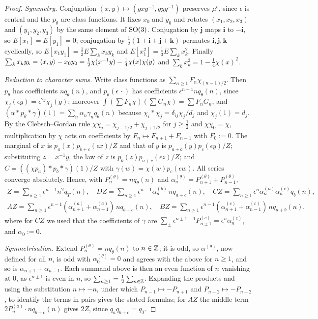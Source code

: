 \begin{proof}
\emph{Symmetry.} Conjugation $(x,y)\mapsto(gxg^{-1},gyg^{-1})$ preserves
$\mu^\epsilon$, since $\epsilon$ is central and the $p_\theta$ are class
functions. It fixes $x_0$ and $y_0$ and rotates $(x_1,x_2,x_3)$ and
$(y_1,y_2,y_3)$ by the same element of $\mathrm{SO}(3)$. Conjugation by $\mathbf j$
maps $\mathbf i$ to $-\mathbf i$, so $E[x_1]=E[y_1]=0$; conjugation by
$\frac12(1+\mathbf i+\mathbf j+\mathbf k)$ permutes $\mathbf i,\mathbf j,
\mathbf k$ cyclically, so $E[x_1y_1]=\frac13E\sum_kx_ky_k$ and $E[x_1^2]=\frac13
E\sum_kx_k^2$. Finally $\sum_kx_ky_k=\langle x,y\rangle-x_0y_0=\frac12\chi(x^{-1}y)-\frac14
\chi(x)\chi(y)$ and $\sum_kx_k^2=1-\frac14\chi(x)^2$.

\emph{Reduction to character sums.} Write class functions as $\sum_{n\ge1}F_n
\chi_{(n-1)/2}$. Then $p_\theta$ has coefficients $nq_\theta(n)$, and
$p_\theta(\epsilon\,\cdot)$ has coefficients $\epsilon^{n-1}nq_\theta(n)$, since
$\chi_j(\epsilon g)=\epsilon^{2j}\chi_j(g)$; moreover $\int(\sum F_n\chi)(\sum
G_n\chi)=\sum F_nG_n$, and $(\alpha*p_\theta*\gamma)(1)=\sum_n\alpha_n\gamma_n
q_\theta(n)$ because $\chi_i*\chi_j=\delta_{ij}\chi_j/d_j$ and $\chi_j(1)=d_j$.
By the Clebsch--Gordan rule $\chi\chi_j=\chi_{j-1/2}+\chi_{j+1/2}$ for $j\ge
\frac12$ and $\chi\chi_0=\chi$, multiplication by $\chi$ acts on coefficients
by $F_n\mapsto F_{n+1}+F_{n-1}$ with $F_0:=0$. The marginal of $x$ is $p_a(x)
p_{b+c}(\epsilon x)/Z$ and that of $y$ is $p_{a+b}(y)p_c(\epsilon y)/Z$;
substituting $z=x^{-1}y$, the law of $z$ is $p_b(z)p_{a+c}(\epsilon z)/Z$; and
$C=((\chi p_a)*p_b*\gamma)(1)/Z$ with $\gamma(w)=\chi(w)p_c(\epsilon w)$. All
series converge absolutely. Hence, with $P^{(\theta)}_n=nq_\theta(n)$ and
$\alpha^{(\theta)}_n=P^{(\theta)}_{n+1}+P^{(\theta)}_{n-1}$,
\begin{gather*}
Z=\sum_{n\ge1}\epsilon^{n-1}n^2q_T(n),\quad DZ=\sum_{n\ge1}\epsilon^{n-1}
\alpha^{(b)}_n\,nq_{a+c}(n),\quad CZ=\sum_{n\ge1}\epsilon^n\alpha^{(a)}_n
\alpha^{(c)}_nq_b(n),\\
AZ=\sum_{n\ge1}\epsilon^{n-1}(\alpha^{(a)}_{n+1}+\alpha^{(a)}_{n-1})\,nq_{b+c}
(n),\quad BZ=\sum_{n\ge1}\epsilon^{n-1}(\alpha^{(c)}_{n+1}+\alpha^{(c)}_{n-1})\,
nq_{a+b}(n),
\end{gather*}
where for $CZ$ we used that the coefficients of $\gamma$ are $\sum_\pm
\epsilon^{n\pm1-1}P^{(c)}_{n\pm1}=\epsilon^n\alpha^{(c)}_n$, and $\alpha_0:=0$.

\emph{Symmetrisation.} Extend $P^{(\theta)}_n=nq_\theta(n)$ to $n\in\mathbb{Z}$; it is
odd, so $\alpha^{(\theta)}$, now defined for all $n$, is odd with
$\alpha^{(\theta)}_0=0$ and agrees with the above for $n\ge1$, and so is
$\alpha_{n+1}+\alpha_{n-1}$. Each summand above is then an even function of $n$
vanishing at $0$, as $\epsilon^{n\pm1}$ is even in $n$, so $\sum_{n\ge1}=\frac12
\sum_{n\in\mathbb{Z}}$. Expanding the products and using the substitution $n\mapsto-n$,
under which $P_{n-1}\mapsto-P_{n+1}$ and $P_{n-2}\mapsto-P_{n+2}$, to identify
the terms in pairs gives the stated formulas; for $AZ$ the middle term
$2P^{(a)}_n\cdot nq_{b+c}(n)$ gives $2Z$, since $q_aq_{b+c}=q_T$.
\end{proof}

